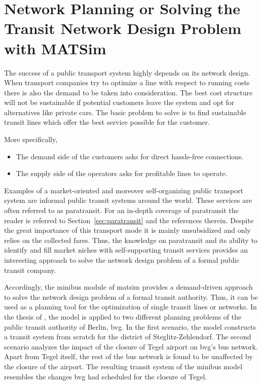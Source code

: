 \section{Network Planning or Solving the Transit Network Design Problem with MATSim}
\label{sec:paratransit_application}
%
The success of a public transport system highly depends on its network design. When transport companies try to optimize a line with respect to running costs there is also the demand to be taken into consideration. The best cost structure will not be sustainable if potential customers leave the system and opt for alternatives like private cars. The basic problem to solve is to find sustainable transit lines which offer the best service possible for the customer.

More specifically,
\begin{itemize}\styleItemize
\item The demand side of the customers asks for direct hassle-free connections.
\item The supply side of the operators asks for profitable lines to operate.
\end{itemize}
Examples of a market-oriented and moreover self-organizing public transport system are informal public transit systems around the world. These services are often referred to as paratransit. For an in-depth coverage of paratransit the reader is referred to Section~\ref{sec:paratransit} and the references therein. Despite the great importance of this transport mode it is mainly unsubsidized and only relies on the collected fares. Thus, the knowledge on paratransit and its ability to identify and fill market niches with self-supporting transit services provides an interesting approach to solve the network design problem of a formal public transit company.

\noindent
Accordingly, the minibus module of \gls{matsim} provides a demand-driven approach to solve the network design problem of a formal transit authority. Thus, it can be used as a planning tool for the optimization of single transit lines or networks. In the thesis of \citet[][]{Neumann_PhDThesis_2014}, the model is applied to two different planning problems of the public transit authority of Berlin, \gls{bvg}. In the first scenario, the model constructs a transit system from scratch for the district of Steglitz-Zehlendorf. The second scenario analyzes the impact of the closure of Tegel airport on \gls{bvg}'s bus network. Apart from Tegel itself, the rest of the bus network is found to be unaffected by the closure of the airport. The resulting transit system of the minibus model resembles the changes \gls{bvg} had scheduled for the closure of Tegel.

